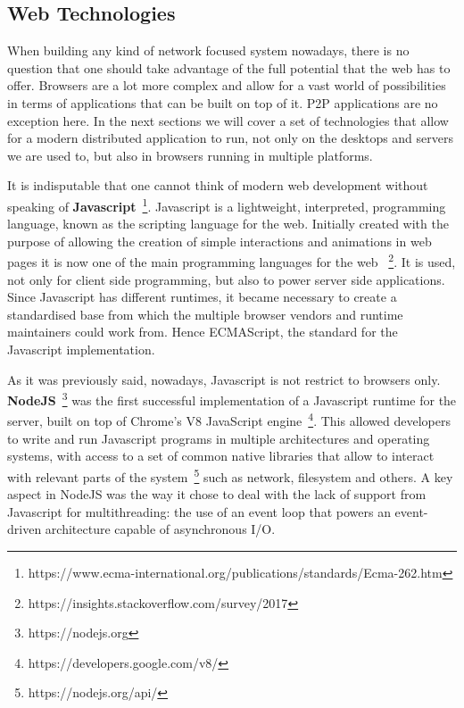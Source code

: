 \subsection{Web Technologies}\label{web-technologies}

When building any kind of network focused system nowadays, there is no
question that one should take advantage of the full potential that the
web has to offer. Browsers are a lot more complex and allow for a vast
world of possibilities in terms of applications that can be built on top
of it. P2P applications are no exception here. In the next sections we
will cover a set of technologies that allow for a modern distributed
application to run, not only on the desktops and servers we are used to,
but also in browsers running in multiple platforms.

It is indisputable that one cannot think of modern web development
without speaking of \textbf{Javascript}~\footnote{https://www.ecma-international.org/publications/standards/Ecma-262.htm}.
Javascript is a lightweight, interpreted, programming language, known as
the scripting language for the web. Initially created with the purpose
of allowing the creation of simple interactions and animations in web
pages it is now one of the main programming languages for the web
~\footnote{https://insights.stackoverflow.com/survey/2017}. It is used, not
only for client side programming, but also to power server side
applications. Since Javascript has different runtimes, it became
necessary to create a standardised base from which the multiple browser
vendors and runtime maintainers could work from. Hence ECMAScript, the standard
for the Javascript implementation.

As it was previously said, nowadays, Javascript is not restrict to
browsers only. \textbf{NodeJS}~\footnote{https://nodejs.org} was the first
successful implementation of a Javascript runtime for the server, built
on top of Chrome's V8 JavaScript engine~\footnote{https://developers.google.com/v8/}. This
allowed developers to write and run Javascript programs in multiple
architectures and operating systems, with access to a set of common
native libraries that allow to interact with relevant parts of the
system~\footnote{https://nodejs.org/api/} such as network, filesystem and
others. A key aspect in NodeJS was the way it chose to deal with the
lack of support from Javascript for multithreading: the use of an event
loop that powers an event-driven architecture capable of asynchronous
I/O.

